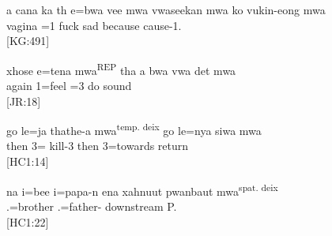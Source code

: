 \ea\label{ex:temp_mwa}
\gll a cana ka th e=bwa vee mwa vwaseekan mwa ko {vukin-eong} mwa\\
  vagina  =1  fuck  sad  because cause-1. \\
\glt {} {[KG:491]}
\z

\ea\label{ex:mwa_deict}
\gll xhose e=tena mwa\textsuperscript{{\upshape REP}} tha a bwa vwa det mwa\textsuperscript{}\\
 again 1=feel  =3  do sound \\
\glt {} {[JR:18]}\\
\z

\ea\label{ex:thathea_mwa}
\gll go le=ja thathe-a {mwa}\textsuperscript{temp. deix} go le=nya siwa mwa\textsuperscript{}\\
  then 3= kill-3  then 3=towards return \\
\glt {} {[HC1:14]}
 \z


\ea\label{ex:spat_mwa}
\gll na i=bee i=papa-n ena xahnuut pwanbaut {mwa}\textsuperscript{spat. deix}\\
   .=brother .=father-  downstream P. \\
 \glt {} {[HC1:22]}
 \z

%
% 


%
% 

